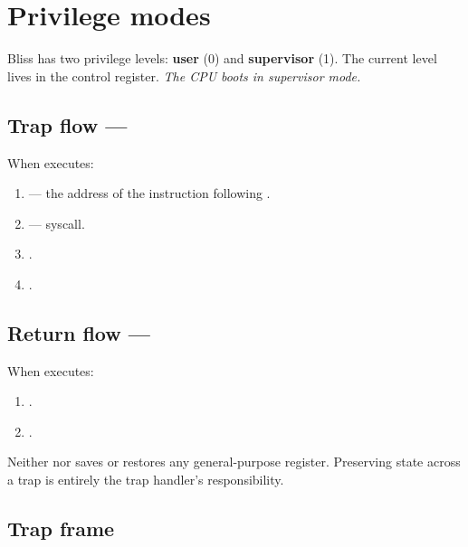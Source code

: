 \documentclass[11pt]{article}
\begin{document}
\section{Privilege modes}

Bliss has two privilege levels: \textbf{user} (0) and \textbf{supervisor} (1).
The current level lives in the  control register. \emph{The CPU boots
in supervisor mode.}

\subsection{Trap flow --- }

When  executes:
\begin{enumerate}[leftmargin=1.8em,itemsep=0.1em]
  \item {} --- the address of the instruction following .
  \item {} --- syscall.
  \item {}.
  \item {}.
\end{enumerate}

\subsection{Return flow --- }

When  executes:
\begin{enumerate}[leftmargin=1.8em,itemsep=0.1em]
  \item {}.
  \item {}.
\end{enumerate}

\begin{blissnote}
Neither  nor  saves or restores any general-purpose
register. Preserving state across a trap is entirely the trap handler's
responsibility.
\end{blissnote}

\subsection{Trap frame}
\end{document}
